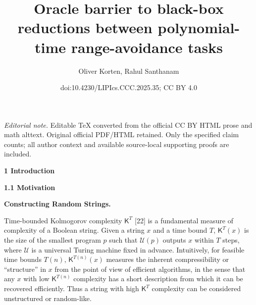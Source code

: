 \documentclass[10pt,a4paper]{article}
\title{Oracle barrier to black-box reductions between polynomial-time range-avoidance tasks}
\author{Oliver Korten, Rahul Santhanam}
\date{doi:10.4230/LIPIcs.CCC.2025.35; CC BY 4.0}
\begin{document}
\maketitle
\noindent\textit{Editorial note.} Editable TeX converted from the official CC BY HTML prose and math alttext. Original official PDF/HTML retained. Only the specified claim counts; all author context and available source-local supporting proofs are included.\par\medskip


\par\medskip\noindent\textbf{
1 Introduction}\par




\par\medskip\noindent\textbf{
1.1 Motivation}\par




\par\medskip\noindent\textbf{Constructing Random Strings.}\par




Time-bounded Kolmogorov complexity ${\mathsf{K}}^{T}$ [22] is a fundamental measure of complexity of a Boolean string. Given a string $x$ and a time bound $T$, ${\mathsf{K}}^{T}(x)$ is the size of the smallest program $p$ such that $\mathcal{U}(p)$ outputs $x$ within $T$ steps, where $\mathcal{U}$ is a universal Turing machine fixed in advance. Intuitively, for feasible time bounds $T(n)$, ${\mathsf{K}}^{T(n)}(x)$ measures the inherent compressibility or “structure” in $x$ from the point of view of efficient algorithms, in the sense that any $x$ with low ${\mathsf{K}}^{T(n)}$ complexity has a short description from which it can be recovered efficiently. Thus a string with high ${\mathsf{K}}^{T}$ complexity can be considered unstructured or random-like.\par
\end{document}
